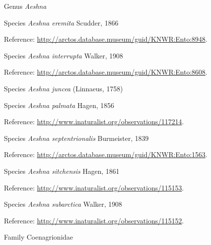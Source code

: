 \documentclass[9pt, article]{memoir}
\begin{document}
\begin{multicols}{2}
\vspace{6pt}\noindent\hspace{30pt}Genus \textit{Aeshna}


\vspace{6pt}\noindent\hspace{36pt}Species \textit{Aeshna eremita} Scudder, 1866


\vspace{6pt}Reference: 
\url{http://arctos.database.museum/guid/KNWR:Ento:8948}.

\vspace{6pt}\noindent\hspace{36pt}Species \textit{Aeshna interrupta} Walker, 1908


\vspace{6pt}Reference: 
\url{http://arctos.database.museum/guid/KNWR:Ento:8608}.

\vspace{6pt}\noindent\hspace{36pt}Species \textit{Aeshna juncea} (Linnaeus, 1758)


\vspace{6pt}\noindent\hspace{36pt}Species \textit{Aeshna palmata} Hagen, 1856


\vspace{6pt}Reference: 
\url{http://www.inaturalist.org/observations/117214}.

\vspace{6pt}\noindent\hspace{36pt}Species \textit{Aeshna septentrionalis} Burmeister, 1839


\vspace{6pt}Reference: 
\url{http://arctos.database.museum/guid/KNWR:Ento:1563}.

\vspace{6pt}\noindent\hspace{36pt}Species \textit{Aeshna sitchensis} Hagen, 1861


\vspace{6pt}Reference: 
\url{http://www.inaturalist.org/observations/115153}.

\vspace{6pt}\noindent\hspace{36pt}Species \textit{Aeshna subarctica} Walker, 1908


\vspace{6pt}Reference: 
\url{http://www.inaturalist.org/observations/115152}.

\vspace{6pt}\noindent\hspace{24pt}Family Coenagrionidae



\end{multicols}
\end{document}

